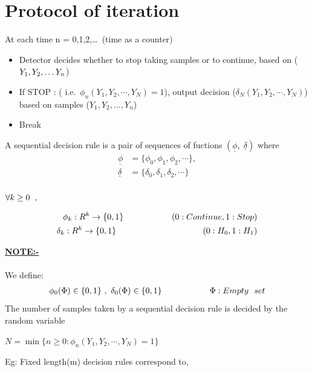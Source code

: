 \documentclass[12pt]{report}
\begin{document}
\section{Protocol of iteration}
At each time n = 0,1,2,\dots\ (time as a counter)\newline
\begin{itemize}
	\item Detector decides whether to stop taking samples or to continue, based on ($Y_1,Y_2,\dots\\ Y_n$)
	\item If STOP : ( i.e.\ $\phi_n(Y_1,Y_2,\cdots,Y_N)=1$), output decision ($\delta_N(Y_1,Y_2,\cdots,Y_N)$) based on samples ($Y_1,Y_2,\dots, Y_n$)
	\item Break
\end{itemize}
\begin{defn}
	A sequential decision rule is a pair of sequences of fuctions $(\underline{\phi},\;\underline{\delta} )$  where
\[\begin{array}{ll}

\underline{\phi}&=\{\phi_0,\phi_1,\phi_2,\cdots\},\\
\underline{\delta}&=\{\delta_0,\delta_1,\delta_2,\cdots\}\\
\end{array}\]


$\forall k\geq0\hspace{2 mm},$

\begin{align*}
{\phi_k}:{R}^k\rightarrow \{0,1\}\hspace{20 mm} (0:Continue,1:Stop)\\
{\delta_k}:{R}^k\rightarrow \{0,1\}\hspace{20 mm}\hspace{16 mm} (0:H_0,1:H_1)
\end{align*}
\end{defn}


\noindent \textbf{\underline{NOTE:-}} \nonumber\\
\\We define:
\begin{align*}
{\phi_0(\Phi)}\in\{0,1\} \ , \  
{\delta_0(\Phi)}\in\{0,1\}
 \hspace{20 mm}\Phi: Empty\ \ set\\
\end{align*}
The number of samples taken by a sequential decision rule is decided by the random variable
\begin{center}
	$N=\min\{n\geq0 : \phi_n(Y_1,Y_2,\cdots,Y_N)=1\}$
\end{center}
Eg: Fixed length(m) decision rules correspond to,
\end{document}
